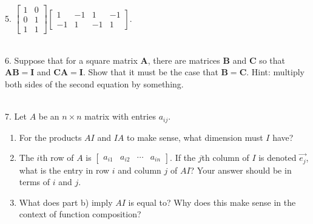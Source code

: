 \documentclass{article}
\begin{document}
5. $\displaystyle \left[\begin{array}{cc}1& 0 \\ 0& 1 \\ 1& 1\end{array}\right]\left[\begin{array}{cccc}1& -1& 1& -1 \\ -1& 1& -1& 1\end{array}\right].$

~\\

6. Suppose that for a square matrix $\mathbf{A}$, there are matrices $\mathbf{B}$ and $\mathbf{C}$ so that $\mathbf{AB} = \mathbf{I}$ and $\mathbf{CA} = \mathbf{I}$. Show that it must be the case that $\mathbf{B} = \mathbf{C}$. Hint: multiply both sides of the second equation by something.

~\\

7. Let $A$ be an $n \times n$ matrix with entries $a_{ij}$.

\begin{enumerate}

	\item For the products $AI$ and $IA$ to make sense, what dimension must $I$ have?

	\item The $i$th row of $A$ is $\left[\begin{array}{cccc}a_{i1}& a_{i2}& \cdots& a_{in}\end{array}\right]$. If the $j$th column of $I$ is denoted $\vec{e_j}$, what is the entry in row $i$ and column $j$ of $AI$? Your answer should be in terms of $i$ and $j$.

	\item What does part b) imply $AI$ is equal to? Why does this make sense in the context of function composition?

\end{enumerate}
\end{document}
